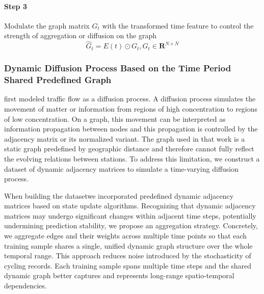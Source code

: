 \documentclass[preprint,12pt,authoryear]{elsarticle}
\begin{document}
\paragraph{Step 3} Modulate the graph matrix $G_t$ with the transformed time feature to control the strength of aggregation or diffusion on the graph
\begin{equation}
\hat{G}_t = E(t)\odot G_t,  \hat{G}_t\in\mathbf{R}^{N\times N}
\end{equation}

\subsubsection{Dynamic Diffusion Process Based on the Time Period Shared Predefined Graph}

\cite{wu2019graph} first modeled traffic flow as a diffusion process. A diffusion process simulates the movement of matter or information from regions of high concentration to regions of low concentration. On a graph, this movement can be interpreted as information propagation between nodes and this propagation is controlled by the adjacency matrix or its normalized variant. The graph used in that work is a static graph predefined by geographic distance and therefore cannot fully reflect the evolving relations between stations. To address this limitation, we construct a dataset of dynamic adjacency matrices to simulate a time-varying diffusion process.

When building the datasetwe incorporated predefined dynamic adjacency matrices based on state update algorithms. Recognizing that dynamic adjacency matrices may undergo significant changes within adjacent time steps, potentially undermining prediction stability, we propose an aggregation strategy. Concretely, we aggregate edges and their weights across multiple time points so that each training sample shares a single, unified dynamic graph structure over the whole temporal range. This approach reduces noise introduced by the stochasticity of cycling records. Each training sample spans multiple time steps and the shared dynamic graph better captures and represents long-range spatio-temporal dependencies.
\end{document}
